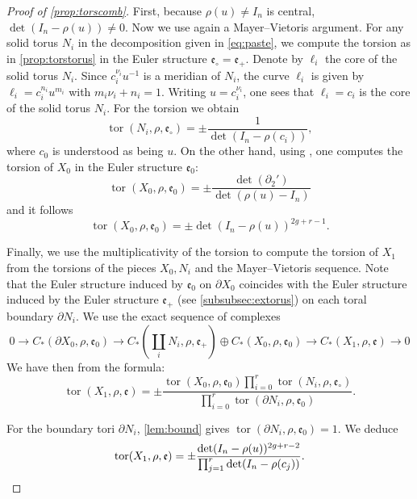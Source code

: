 \documentclass[JEP,XML,SOM,Unicode,NoFloatCountersInSection,published]{cedram}
\theoremstyle{plain}
\theoremstyle{definition}
\theoremstyle{remark}
\numberwithin{equation}{section}
\DeclareMathOperator{\tor}{tor}
\begin{document}
\begin{proof}[Proof of \cref{prop:torscomb}]
First, because $\rho(u) \neq I_n$ is central, $\det(I_n - \rho(u)) \neq 0$.
Now we use again a Mayer--Vietoris argument.
For any solid torus $N_i$ in the decomposition given in \cref{eq:paste}, we compute the torsion as in \cref{prop:torstorus} in the Euler structure $\mathfrak e_\circ = \mathfrak e_+$. Denote by $\ell_i$ the core of the solid torus $N_i$. Since $c_i^{\nu_i} u^{-1}$ is a meridian of $N_i$, the curve $\ell_i$ is given by $\ell_i= c_i^{n_i} u^{m_i}$ with $m_i\nu_i + n_i = 1$. Writing $u=c_i^{\nu_i}$, one sees that $\ell_i = c_i$ is the core of the solid torus $N_i$. For the torsion we obtain
\[
\tor(N_i, \rho, \mathfrak e_\circ) = \pm \frac 1 {\det(I_n - \rho(c_i))},
\]
where $c_0$ is understood as being $u$.
On the other hand, using \cite[Th.\,2.2]{Turaev_book}, one computes the torsion of $X_0$ in the Euler structure $\mathfrak e_0$:
\begin{equation}
\label{eq:torX0}
\tor(X_0, \rho, \mathfrak e_0) = \pm \frac{\det(\partial_2')}{\det(\rho(u)-I_n)}
\end{equation}
and it follows
\begin{equation}
\label{eq:tor0}
\tor(X_0, \rho, \mathfrak e_0) = \pm \det(I_n-\rho(u))^{2g+r-1}.
\end{equation}

Finally, we use the multiplicativity of the torsion to compute the torsion of $X_1$ from the torsions of the pieces $X_0, N_i$ and the Mayer--Vietoris sequence.
Note that the Euler structure induced by $\mathfrak e_0$ on $\partial X_0$ coincides with the Euler structure induced by the Euler structure $\mathfrak e_+$ (see \cref{subsubsec:extorus}) on each toral boundary $\partial N_i$.
We use the exact sequence of complexes
\[
0 \to C_*(\partial X_0, \rho, \mathfrak e_0) \to C_*({\textstyle\coprod_i N_i}, \rho, \mathfrak e_+) \oplus C_*(X_0, \rho, \mathfrak e_0) \to C_*(X_1, \rho, \mathfrak e) \to 0
\]
We have then from \cite[Th.\,1.5]{Turaev_book} the formula:
\[
\tor(X_1, \rho, \mathfrak e) =\pm \frac{\tor(X_0, \rho, \mathfrak e_0) \prod_{i=0}^r\tor(N_i, \rho, \mathfrak e_\circ)}{\prod_{i=0}^r\tor(\partial N_i,\rho, \mathfrak e_0)}.
\]

For the boundary tori $\partial N_i$, \cref{lem:bound} gives $\tor(\partial N_i, \rho, \mathfrak e_0) = 1$. We deduce
\begin{equation*}
\tor(X_1, \rho, \mathfrak e) = \pm \frac{\det(I_n-\rho(u))^{2g+r-2}}{\prod_{j=1}^r \det(I_n-\rho(c_j))}.\qedhere
\end{equation*}
\end{proof}
\end{document}
